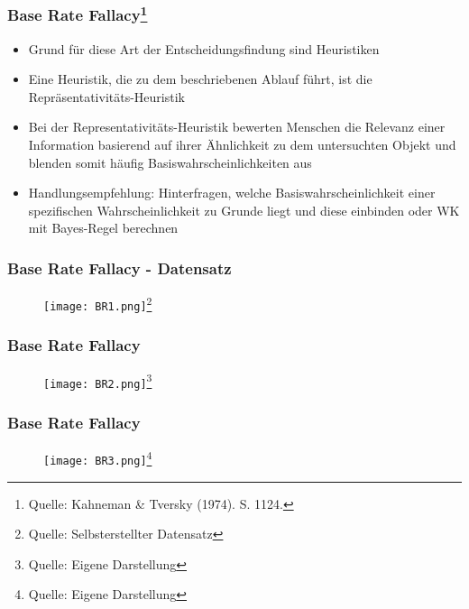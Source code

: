 \documentclass{beamer}
\begin{document}
\begin{frame}
\frametitle{Base Rate Fallacy\footnote{Quelle: {Kahneman \& Tversky (1974). S. 1124.}}}
\begin{itemize}
    \item Grund für diese Art der Entscheidungsfindung sind Heuristiken
    \item Eine Heuristik, die zu dem beschriebenen Ablauf führt, ist die Repräsentativitäts-Heuristik
    \item Bei der Representativitäts-Heuristik bewerten Menschen die Relevanz einer Information basierend auf ihrer Ähnlichkeit zu dem untersuchten Objekt und blenden somit häufig Basiswahrscheinlichkeiten aus
    \item Handlungsempfehlung: Hinterfragen, welche Basiswahrscheinlichkeit einer spezifischen Wahrscheinlichkeit zu Grunde liegt und diese einbinden oder WK mit Bayes-Regel berechnen
\end{itemize}
\end{frame}

\begin{frame}
\frametitle{Base Rate Fallacy - Datensatz}

\begin{figure}
    \centering
    \texttt{[image: BR1.png]}\footnote{Quelle: {Selbsterstellter Datensatz}}
    
\end{figure}

\end{frame}

\begin{frame}
\frametitle{Base Rate Fallacy}

\begin{figure}
    \centering
    \texttt{[image: BR2.png]}\footnote{Quelle: {Eigene Darstellung}}
    
\end{figure}

\end{frame}

\begin{frame}
\frametitle{Base Rate Fallacy}

\begin{figure}
    \centering
    \texttt{[image: BR3.png]}\footnote{Quelle: {Eigene Darstellung}}
    
\end{figure}

\end{frame}
\end{document}
